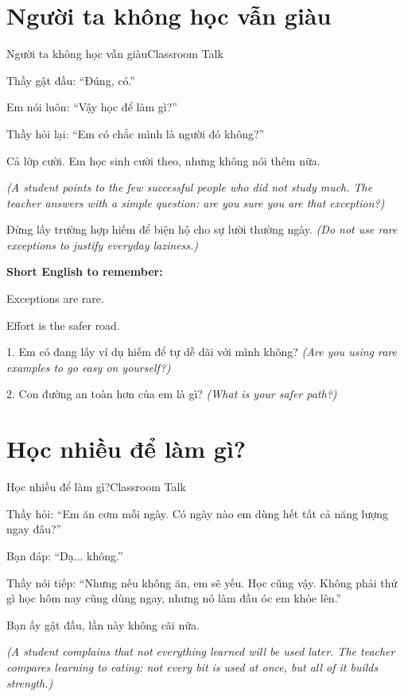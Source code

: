\section{Người ta không học vẫn giàu}
\begin{truyen}{Người ta không học vẫn giàu}{Classroom Talk}

Thầy gật đầu: ``Đúng, có.''

Em nói luôn: ``Vậy học để làm gì?''

Thầy hỏi lại: ``Em có chắc mình là người đó không?''

Cả lớp cười. Em học sinh cười theo, nhưng không nói thêm nữa.

\textit{(A student points to the few successful people who did not study much. The teacher answers with a simple question: are you sure you are that exception?)}
\end{truyen}

\begin{baihoc}
Đừng lấy trường hợp hiếm để biện hộ cho sự lười thường ngày.
\textit{(Do not use rare exceptions to justify everyday laziness.)}
\end{baihoc}

\begin{ghinhoanh}
\textbf{Short English to remember:}

Exceptions are rare.

Effort is the safer road.
\end{ghinhoanh}

\begin{tuhocnhanh}
1. Em có đang lấy ví dụ hiếm để tự dễ dãi với mình không? \textit{(Are you using rare examples to go easy on yourself?)}

2. Con đường an toàn hơn của em là gì? \textit{(What is your safer path?)}
\end{tuhocnhanh}
\ngancach

\section{Học nhiều để làm gì?}
\begin{truyen}{Học nhiều để làm gì?}{Classroom Talk}

Thầy hỏi: ``Em ăn cơm mỗi ngày. Có ngày nào em dùng hết tất cả năng lượng ngay đâu?''

Bạn đáp: ``Dạ... không.''

Thầy nói tiếp: ``Nhưng nếu không ăn, em sẽ yếu. Học cũng vậy. Không phải thứ gì học hôm nay cũng dùng ngay, nhưng nó làm đầu óc em khỏe lên.''

Bạn ấy gật đầu, lần này không cãi nữa.

\textit{(A student complains that not everything learned will be used later. The teacher compares learning to eating: not every bit is used at once, but all of it builds strength.)}
\end{truyen}

